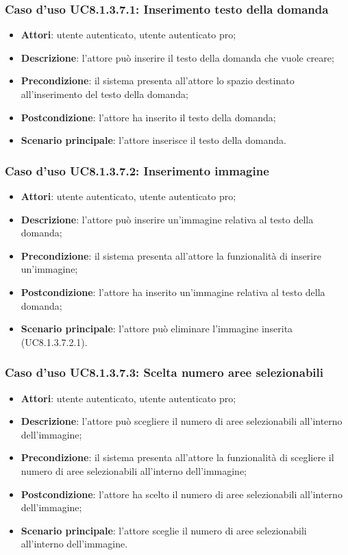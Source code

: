 \subsubsection{Caso d'uso UC8.1.3.7.1: Inserimento testo della domanda}
\begin{itemize}
	\item \textbf{Attori}: utente autenticato, utente autenticato pro;
	\item \textbf{Descrizione}: l'attore può inserire il testo della domanda che vuole creare;
	\item \textbf{Precondizione}: il sistema presenta all'attore lo spazio destinato all'inserimento del testo della domanda;
	\item \textbf{Postcondizione}: l'attore ha inserito il testo della domanda;
	\item \textbf{Scenario principale}: l'attore inserisce il testo della domanda. 
\end{itemize}

\subsubsection{Caso d'uso UC8.1.3.7.2: Inserimento immagine}
\begin{itemize}
	\item \textbf{Attori}: utente autenticato, utente autenticato pro;
	\item \textbf{Descrizione}: l'attore può inserire un'immagine relativa al testo della domanda;
	\item \textbf{Precondizione}: il sistema presenta all'attore la funzionalità di inserire un'immagine;
	\item \textbf{Postcondizione}: l'attore ha inserito un'immagine relativa al testo della domanda;
	\item \textbf{Scenario principale}: l'attore può eliminare l'immagine inserita (UC8.1.3.7.2.1).			
	\end{itemize}

\subsubsection{Caso d'uso UC8.1.3.7.3: Scelta numero aree selezionabili}
\begin{itemize}
	\item \textbf{Attori}: utente autenticato, utente autenticato pro;
	\item \textbf{Descrizione}: l'attore può scegliere il numero di aree selezionabili all'interno dell'immagine;
	\item \textbf{Precondizione}: il sistema presenta all'attore la funzionalità di scegliere il numero di aree selezionabili all'interno dell'immagine; 	
	\item \textbf{Postcondizione}: l'attore ha scelto il numero di aree selezionabili all'interno dell'immagine;
	\item \textbf{Scenario principale}: l'attore sceglie il numero di aree selezionabili all'interno dell'immagine. 	
\end{itemize}


